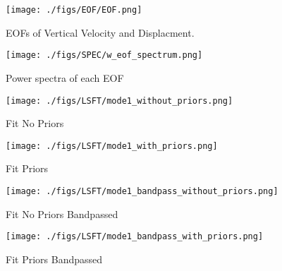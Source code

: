 \documentclass{article}
\begin{document}
\begin{figure}
    \centering
    \texttt{[image: ./figs/EOF/EOF.png]}
    \caption{EOFs of Vertical Velocity and Displacment.}
\end{figure}

\begin{figure}
    \centering
    \texttt{[image: ./figs/SPEC/w\_eof\_spectrum.png]}
    \caption{Power spectra of each EOF}
\end{figure}

\begin{figure}
    \centering
    \texttt{[image: ./figs/LSFT/mode1\_without\_priors.png]}
    \caption{Fit No Priors}
\end{figure}

\begin{figure}
    \centering
    \texttt{[image: ./figs/LSFT/mode1\_with\_priors.png]}
    \caption{Fit Priors}
\end{figure}

\begin{figure}
    \centering
    \texttt{[image: ./figs/LSFT/mode1\_bandpass\_without\_priors.png]}
    \caption{Fit No Priors Bandpassed}
\end{figure}

\begin{figure}
    \centering
    \texttt{[image: ./figs/LSFT/mode1\_bandpass\_with\_priors.png]}
    \caption{Fit Priors Bandpassed}
\end{figure}
\end{document}
